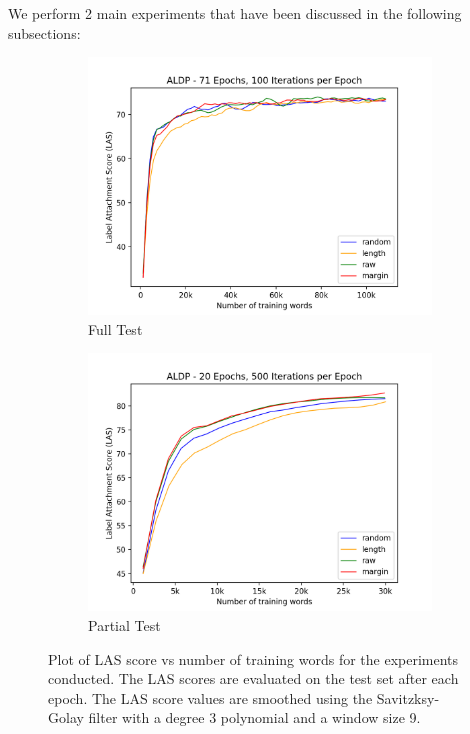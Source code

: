 \documentclass[11pt,letterpaper]{article}
\begin{document}
 We perform 2 main experiments that have been discussed in the following subsections:
 
 \begin{figure}[htbp]
	\centering
	\captionsetup{justification=centering}
	\begin{subfigure}[b]{0.48\textwidth}
		\centering
		\includegraphics[width=\linewidth]{aldp_71_100_smooth}
		\caption{Full Test}
		\label{a}
	\end{subfigure}
	\centering
	\begin{subfigure}[b]{0.48\textwidth}
		\centering
		\includegraphics[width=\linewidth]{aldp_20_500_smooth}
		\caption{Partial Test}
		\label{b}
	\end{subfigure}
	\caption{Plot of LAS score vs number of training words for the experiments conducted. The LAS scores are evaluated on the test set after each epoch. The LAS score values are smoothed using the Savitzksy-Golay filter with a degree 3 polynomial and a window size 9.}
	\label{fig:graphs}
\end{figure}
 
\end{document}
